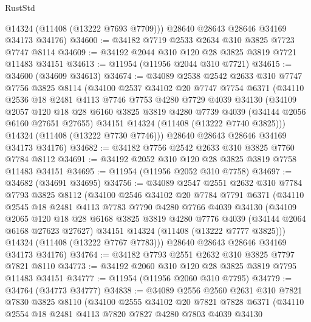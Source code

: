 \begin{lexlean}{RustStd}
\begin{coremodule}
        @14324
        (@11408 (@13222 @7693 @7709)))
      @28640
      @28643
      @28646
      @34169
      @34173
      @34176)
@34600 := @34182 @7719 @2533 @2634 @310 @3825 @7723 @7747 @8114
@34609 := @34192 @2044 @310 @120 @28 @3825 @3819 @7721 @11483 @34151
@34613 := @11954 (@11956 @2044 @310 @7721)
@34615 := @34600 (@34609 @34613)
@34674 := @34089
    @2538
    @2542
    @2633
    @310
    @7747
    @7756
    @3825
    @8114
    (@34100
      @2537
      @34102
      @20
      @7747
      @7754
      @6371
      (@34110
        @2536
        @18
        @2481
        @4113
        @7746
        @7753
        @4280
        @7729
        @4039
        @34130
        (@34109
          @2057
          @120
          @18
          @28
          @6160
          @3825
          @3819
          @4280
          @7739
          @4039
          (@34144 @2056 @6160 @27651 @27655)
          @34151
          @14324
          (@11408 (@13222 @7740 @3825)))
        @14324
        (@11408 (@13222 @7730 @7746)))
      @28640
      @28643
      @28646
      @34169
      @34173
      @34176)
@34682 := @34182 @7756 @2542 @2633 @310 @3825 @7760 @7784 @8112
@34691 := @34192 @2052 @310 @120 @28 @3825 @3819 @7758 @11483 @34151
@34695 := @11954 (@11956 @2052 @310 @7758)
@34697 := @34682 (@34691 @34695)
@34756 := @34089
    @2547
    @2551
    @2632
    @310
    @7784
    @7793
    @3825
    @8112
    (@34100
      @2546
      @34102
      @20
      @7784
      @7791
      @6371
      (@34110
        @2545
        @18
        @2481
        @4113
        @7783
        @7790
        @4280
        @7766
        @4039
        @34130
        (@34109
          @2065
          @120
          @18
          @28
          @6168
          @3825
          @3819
          @4280
          @7776
          @4039
          (@34144 @2064 @6168 @27623 @27627)
          @34151
          @14324
          (@11408 (@13222 @7777 @3825)))
        @14324
        (@11408 (@13222 @7767 @7783)))
      @28640
      @28643
      @28646
      @34169
      @34173
      @34176)
@34764 := @34182 @7793 @2551 @2632 @310 @3825 @7797 @7821 @8110
@34773 := @34192 @2060 @310 @120 @28 @3825 @3819 @7795 @11483 @34151
@34777 := @11954 (@11956 @2060 @310 @7795)
@34779 := @34764 (@34773 @34777)
@34838 := @34089
    @2556
    @2560
    @2631
    @310
    @7821
    @7830
    @3825
    @8110
    (@34100
      @2555
      @34102
      @20
      @7821
      @7828
      @6371
      (@34110
        @2554
        @18
        @2481
        @4113
        @7820
        @7827
        @4280
        @7803
        @4039
        @34130

\end{coremodule}
\end{lexlean}
